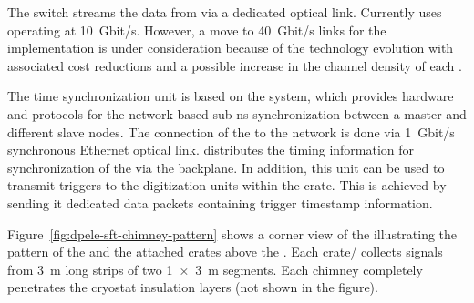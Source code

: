 The  switch streams the data from  via a dedicated optical link. Currently  uses  operating at \SI{10}{Gbit/s}. However, a move to \SI{40}{Gbit/s} links for the  implementation is under consideration because of the technology evolution with associated cost reductions and a possible increase in the channel density of each .

The  time synchronization unit is based on the  system, which provides hardware and protocols for the network-based sub-\si{\nano\s} synchronization between a master and different slave nodes. The connection of the  to the  network is done via \SI{1}{Gbit/s} synchronous Ethernet optical link.  distributes the timing information for synchronization of the  via the  backplane. In addition, this unit can be used to transmit triggers to the digitization units within the crate. This is achieved by sending it dedicated data packets containing trigger timestamp information. 

Figure~\ref{fig:dpele-sft-chimney-pattern} shows a corner view of the  illustrating the pattern of the  and the attached  crates above the . Each crate/ collects signals from \SI{3}{\meter} long strips of two \SI[product-units=power]{1x3}{\meter}  segments. Each chimney completely %
penetrates the cryostat insulation layers (not shown in the figure). 


